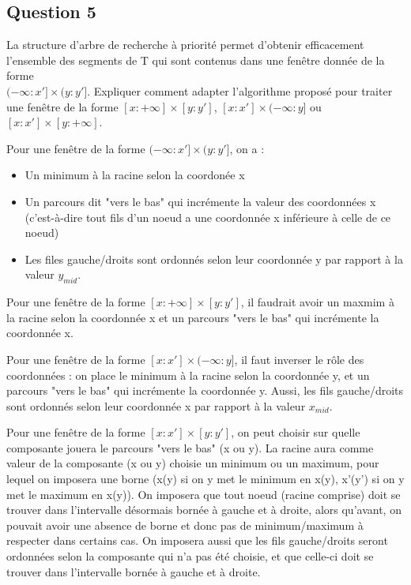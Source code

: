 \documentclass{article}
\newcommand{\gray}{\color{gray}}
\begin{document}
\newpage

\subsection{Question 5} La structure d'arbre de recherche à priorité permet d'obtenir efficacement l'ensemble
des segments de T qui sont contenus dans une fenêtre donnée de la forme \\$(- \infty : x'] \times (y : y']$.
Expliquer comment adapter l'algorithme proposé pour traiter une fenêtre de la forme $[x : + \infty] \times [y : y']$,
$[x : x'] \times (- \infty : y]$ ou $[x : x'] \times [y : + \infty]$.


\bigskip

\gray
Pour une fenêtre de la forme $(- \infty : x'] \times (y : y']$, on a :
\begin{itemize}
    \item Un minimum à la racine selon la coordonée x
    \item Un parcours dit "vers le bas" qui incrémente la valeur des coordonnées x 
    (c'est-à-dire tout fils d'un noeud a une coordonnée x inférieure à celle de ce noeud)
    \item Les files gauche/droits sont ordonnés selon leur coordonnée y par rapport à la valeur $y_{mid}$.
\end{itemize}
Pour une fenêtre de la forme $[x : + \infty] \times [y : y']$, il faudrait avoir un maxmim à la racine selon la coordonnée x et un parcours "vers le bas" qui incrémente la coordonnée x. 

Pour une fenêtre de la forme $[x : x'] \times (- \infty : y]$, il faut inverser le rôle des coordonnées : on place le minimum à la racine selon la coordonnée y, et un parcours "vers le bas" qui
incrémente la coordonnée y. Aussi, les fils gauche/droits sont ordonnés selon leur coordonnée x par rapport à la valeur $x_{mid}$.

Pour une fenêtre de la forme $[x : x'] \times [y : y']$, on peut choisir sur quelle composante jouera le parcours "vers le bas" (x ou y). La racine aura comme valeur de la composante (x ou y) choisie
un minimum ou un maximum, pour lequel on imposera une borne (x(y) si on y met le minimum en x(y), x'(y') si on y met le maximum en x(y)). On imposera que tout noeud (racine comprise) doit se trouver dans l'intervalle désormais bornée
à gauche et à droite, alors qu'avant, on pouvait avoir une absence de borne et donc pas de minimum/maximum à respecter dans certains cas. On imposera aussi que les fils gauche/droits seront ordonnées selon la composante qui n'a
pas été choisie, et que celle-ci doit se trouver dans l'intervalle bornée à gauche et à droite.
\end{document}
